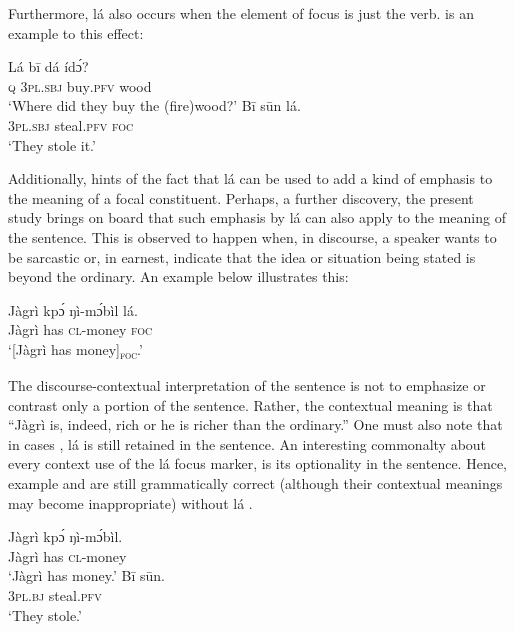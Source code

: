 \documentclass[output=paper,colorlinks,citecolor=brown]{langscibook}
\begin{document}
Furthermore, lá also occurs when the element of focus is just the verb.  is an example to this effect:

\ea%
    \label{ex:bisilki:27}
    \ea\label{ex:bisilki:27a}
    \gll    Lá	bī		dá		ídɔ́?\\
            \textsc{q}	\textsc{3pl.sbj}	buy\textsc{.pfv}	wood\\
    \glt    ‘Where did they buy the (fire)wood?’
    \ex\label{ex:bisilki:27b}
    \gll    Bī		sūn		lá.\\
            \textsc{3pl.sbj}	steal\textsc{.pfv}	\textsc{foc}\\
    \glt    ‘They stole it.’
    \z
\z

Additionally, \citet{Schwarz2009} hints of the fact that lá can be used to add a kind of emphasis to the meaning of a focal constituent. Perhaps, a further discovery, the present study brings on board that such emphasis by lá can also apply to the meaning of the sentence. This is observed to happen when, in discourse, a speaker wants to be sarcastic or, in earnest, indicate that the idea or situation being stated is beyond the ordinary. An example  below illustrates this:

\ea%
    \label{ex:bisilki:28}
    \gll    Jàgrì	kpɔ́	ŋì-mɔ́bìl	lá.\\
            Jàgrì	has	\textsc{cl-}money	\textsc{foc}\\
    \glt    ‘[Jàgrì has money]\textsubscript{\textsc{foc}}.’
\z

The discourse-contextual interpretation of the sentence  is not to emphasize or contrast only a portion of the sentence. Rather, the contextual meaning is that “Jàgrì is, indeed, rich or he is richer than the ordinary.” One must also note that in cases , lá is still retained in the sentence. An interesting commonalty about every context use of the lá focus marker, is its optionality in the sentence. Hence, example  and  are still grammatically correct (although their contextual meanings may become inappropriate) without lá .

\ea%
    \label{ex:bisilki:29}
    \ea\label{ex:bisilki:29a}
    \gll    Jàgrì	kpɔ́	ŋì-mɔ́bìl.\\
            Jàgrì	has	\textsc{cl-}money\\
    \glt    ‘Jàgrì has money.’
    \ex\label{ex:bisilki:29b}
    \gll    Bī		sūn.\\
            \textsc{3pl.bj}		steal\textsc{.pfv}\\
    \glt    ‘They stole.’
    \z
\z
\end{document}
